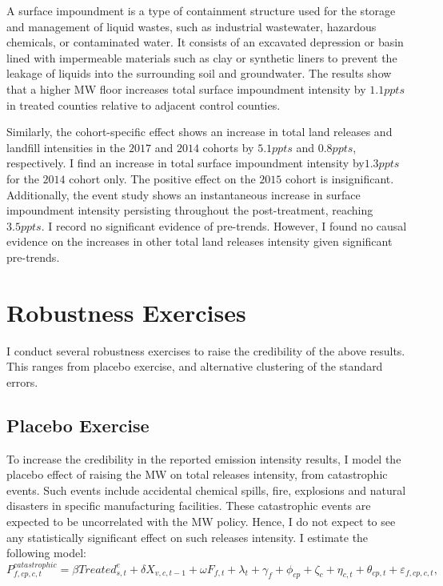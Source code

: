 \documentclass[authoryear, preprint, twocolumn, 1p]{elsarticle}
\begin{document}
    A surface impoundment is a type of containment structure used for the storage and management of liquid wastes, such as industrial wastewater, hazardous chemicals, or contaminated water. It consists of an excavated depression or basin lined with impermeable materials such as clay or synthetic liners to prevent the leakage of liquids into the surrounding soil and groundwater. The results show that a higher MW floor increases total surface impoundment intensity by $1.1ppts$ in treated counties relative to adjacent control counties.

    Similarly, the cohort-specific effect shows an increase in total land releases and landfill intensities in the $2017$ and $2014$ cohorts by $5.1ppts$ and $0.8ppts$, respectively. I find an increase in total surface impoundment intensity by$1.3ppts$ for the $2014$ cohort only. The positive effect on the $2015$ cohort is insignificant. Additionally, the event study shows an instantaneous increase in surface impoundment intensity persisting throughout the post-treatment, reaching $3.5ppts$. I record no significant evidence of pre-trends. However, I found no causal evidence on the increases in other total land releases intensity given significant pre-trends.
    


    \section{Robustness Exercises}\label{sec:robustness-exercises}
    I conduct several robustness exercises to raise the credibility of the above results. This ranges from placebo exercise, and alternative clustering of the standard errors.

    \subsection{Placebo Exercise}\label{subsec:placebo-exercise}
    To increase the credibility in the reported emission intensity results, I model the placebo effect of raising the MW on total releases intensity, from catastrophic events. Such events include accidental chemical spills, fire, explosions and natural disasters in specific manufacturing facilities. These catastrophic events are expected to be uncorrelated with the MW policy. Hence, I do not expect to see any statistically significant effect on such releases intensity. I estimate the following model:
    \begin{equation}
        P_{f,cp,c,t}^{catastrophic} = \beta Treated_{s,t}^e + \delta X_{v,c,t-1} + \omega F_{f,t} + \lambda_{t} + \gamma_{f} + \phi_{cp} + \zeta_{c} + \eta_{c,t} + \theta_{cp,t} + \varepsilon_{f,cp,c,t},\label{eq:robustness-placebo}
    \end{equation}
    
\end{document}
